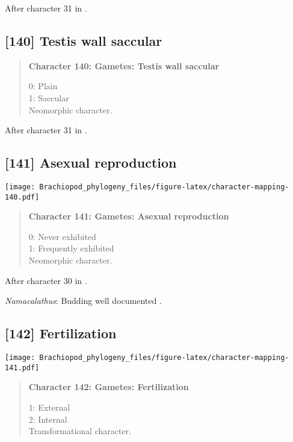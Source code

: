 \documentclass[openany]{book}
\theoremstyle{definition}
\theoremstyle{definition}
\theoremstyle{definition}
\theoremstyle{remark}
\begin{document}
After character 31 in \citet{Haszprunar1996}.

\subsection*{{[}140{]} Testis wall saccular}\label{testis-wall-saccular}

\begin{quote}
\textbf{Character 140: Gametes: Testis wall saccular}

0: Plain\\
1: Saccular\\
Neomorphic character.
\end{quote}

After character 31 in \citet{Haszprunar1996}.

\subsection*{{[}141{]} Asexual reproduction}\label{asexual-reproduction}

\texttt{[image: Brachiopod\_phylogeny\_files/figure-latex/character-mapping-140.pdf]}

\begin{quote}
\textbf{Character 141: Gametes: Asexual reproduction}

0: Never exhibited\\
1: Frequently exhibited\\
Neomorphic character.
\end{quote}

After character 30 in \citet{Haszprunar1996}.

\hypertarget{Namacalathus-coding-141}{}
\emph{Namacalathus}: Budding well documented
\citep[e.g.][]{Zhuravlev2015Ediacaranskeletal}.

\subsection*{{[}142{]} Fertilization}\label{fertilization}

\texttt{[image: Brachiopod\_phylogeny\_files/figure-latex/character-mapping-141.pdf]}

\begin{quote}
\textbf{Character 142: Gametes: Fertilization}

1: External\\
2: Internal\\
Transformational character.
\end{quote}
\end{document}
